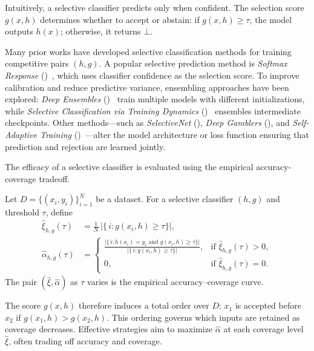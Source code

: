 Intuitively, a selective classifier predicts only when confident.  
The selection score \(g(x, h)\) determines whether to accept or abstain: if \(g(x, h) \geq \tau\), the model outputs \(h(x)\); otherwise, it returns \(\bot\).

Many prior works have developed selective classification methods for training competitive pairs \((h, g)\).  
A popular selective prediction method is \emph{Softmax Response} (\sr)~\citep{hendrycks2016baseline, geifman2017selective}, which uses classifier confidence as the selection score.  
To improve calibration and reduce predictive variance, ensembling approaches have been explored: \emph{Deep Ensembles} (\de)~\citep{lakshminarayanan2017simple} train multiple models with different initializations, while \emph{Selective Classification via Training Dynamics} (\sctd)~\citep{rabanser2022selective} ensembles intermediate checkpoints.  
Other methods—such as \emph{SelectiveNet} (\sn)\citep{geifman2019selectivenet}, \emph{Deep Gamblers} (\dg)\citep{liu2019deep}, and \emph{Self-Adaptive Training} (\sat)~\citep{huang2020self}—alter the model architecture or loss function ensuring that prediction and rejection are learned jointly.

The efficacy of a selective classifier is evaluated using the empirical accuracy-coverage tradeoff.

\begin{definition}
\label{def:emp_acc_cov}
Let \(D=\{(x_i,y_i)\}_{i=1}^N\) be a dataset.  For a selective classifier \((h,g)\) and threshold \(\tau\), define
\begin{align}
\label{eq:emp_coverage}
\hat{\xi}_{h,g}(\tau)
&= \frac{1}{N}\,\bigl|\{\,i : g(x_i,h) \ge \tau \}\bigr|,
\\[6pt]
\label{eq:emp_accuracy}
\hat{\alpha}_{h,g}(\tau)
&= 
\begin{cases}
\displaystyle
\frac{\bigl|\{\,i : h(x_i)=y_i \text{ and } g(x_i,h) \ge \tau \}\bigr|}{
      \bigl|\{\,i : g(x_i,h) \ge \tau \}\bigr|}, 
& \text{if } \hat{\xi}_{h,g}(\tau)>0,\\[10pt]
0, & \text{if } \hat{\xi}_{h,g}(\tau)=0.
\end{cases}
\end{align}
The pair \((\hat{\xi}, \hat{\alpha})\) as \(\tau\) varies is the empirical accuracy–coverage curve.
\end{definition}
The score \(g(x,h)\) therefore induces a total order over \(D\): \(x_1\) is accepted before \(x_2\) if \(g(x_1,h) > g(x_2,h)\).  
This ordering governs which inputs are retained as coverage decreases.  
Effective strategies aim to maximize \(\hat{\alpha}\) at each coverage level \(\hat{\xi}\), often trading off accuracy and coverage.


